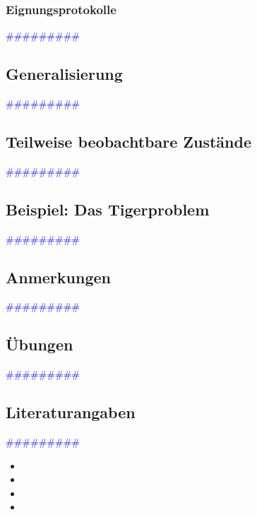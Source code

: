 \documentclass{article}
\begin{document}
    \subsubsection{Eignungsprotokolle} %
      \textcolor{blue}{\#\#\#\#\#\#\#\#\#}
  \subsection{Generalisierung} %
      \textcolor{blue}{\#\#\#\#\#\#\#\#\#}
  \subsection{Teilweise beobachtbare Zustände} %
      \textcolor{blue}{\#\#\#\#\#\#\#\#\#}
  \subsection{Beispiel: Das Tigerproblem} %
      \textcolor{blue}{\#\#\#\#\#\#\#\#\#}
  \subsection{Anmerkungen} %
      \textcolor{blue}{\#\#\#\#\#\#\#\#\#}
  \subsection{Übungen} %
      \textcolor{blue}{\#\#\#\#\#\#\#\#\#}
  \subsection{Literaturangaben} %
      \textcolor{blue}{\#\#\#\#\#\#\#\#\#}

      \begin{itemize}
      \color{red}
        \item 
        \item
      \color{ForestGreen}
        \item
        \item
      \end{itemize}
\end{document}

